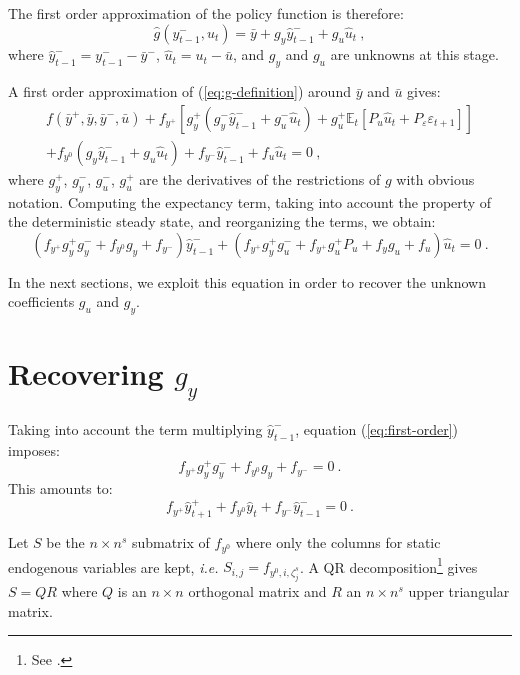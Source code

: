 \documentclass[11pt,a4paper]{article}
\begin{document}
The first order approximation of the policy function is therefore:
\begin{equation*}
  \hat{g}(y^-_{t-1}, u_t) = \bar{y} + g_y \hat{y}^-_{t-1} + g_u \hat{u}_t \: ,
\end{equation*}
where $\hat{y}^-_{t-1} = y^-_{t-1} - \bar{y}^-$, $\hat{u}_t = u_t - \bar{u}$,
and $g_y$ and $g_u$ are unknowns at this stage.

A first order approximation of (\ref{eq:g-definition}) around $\bar{y}$ and
$\bar{u}$ gives:
\begin{multline*}
  f(\bar{y}^+, \bar{y}, \bar{y}^-, \bar{u}) + f_{y^+} [g^+_y(g^-_y
  \hat{y}^-_{t-1} + g^-_u \hat{u}_t) + g^+_u \mathbb{E}_t [P_u \hat{u}_t +
  P_\varepsilon \varepsilon_{t+1}] ] \\ + f_{y^0} (g_y \hat{y}^-_{t-1} + g_u \hat{u}_t) + f_{y^-}\hat{y}^-_{t-1} + f_u \hat{u}_t = 0 \: ,
\end{multline*}
where $g^+_y$, $g^-_y$, $g^-_u$, $g^+_u$ are the derivatives of the
restrictions of $g$ with obvious notation. Computing the expectancy term,
taking into account the property of the deterministic steady state, and
reorganizing the terms, we obtain:
\begin{equation}
  \label{eq:first-order}
  (f_{y^+} g^+_y g^-_y + f_{y^0}  g_y + f_{y^-}) \hat{y}^-_{t-1} + (f_{y^+} g^+_yg^-_u+ f_{y^+}g^+_u P_u + f_y g_u + f_u) \hat{u}_t = 0 \: .
\end{equation}

In the next sections, we exploit this equation in order to recover the unknown
coefficients $g_u$ and $g_y$.

\section{Recovering $g_y$}
\label{sec:g-y}

Taking into account the term multiplying $\hat{y}^-_{t-1}$, equation
(\ref{eq:first-order}) imposes:
\begin{equation*}
  f_{y^+} g^+_y g^-_y + f_{y^0}  g_y + f_{y^-} = 0 \: .
\end{equation*}
This amounts to:
\begin{equation}
  \label{eq:gy}
  f_{y^+} \hat{y}^+_{t+1} + f_{y^0} \hat{y}_t + f_{y^-} \hat{y}^-_{t-1} = 0 \: .
\end{equation}

Let $S$ be the $n\times n^s$ submatrix of $f_{y^0}$ where only the columns for
static endogenous variables are kept, \textit{i.e.} $S_{i,j} = f_{y^0, i,
  \zeta^s_j}$. A QR decomposition\footnote{See \citet[section
  5.2]{golub/van-loan:1996}.} gives $S = QR$ where $Q$ is an $n\times n$
orthogonal matrix and $R$ an $n\times n^s$ upper triangular matrix.
\end{document}

